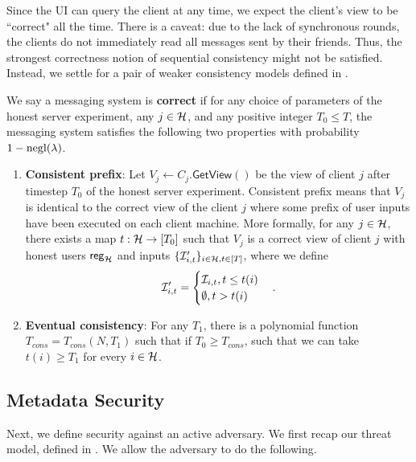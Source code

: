 Since the UI can query the client at any time, we expect the client's view to be ``correct" all the time. There is a caveat: due to the lack of synchronous rounds, the clients do not immediately read all messages sent by their friends. Thus, the strongest correctness notion of sequential consistency might not be satisfied. Instead, we settle for a pair of weaker consistency models defined in \cite{doug13Consistency}. 
\begin{definition}
\label{defn:messaging-correctness}
 We say a messaging system is \textbf{correct} if for any choice of parameters of the honest server experiment, any $j \in \mathcal{H}$, and any positive integer $T_0 \leq T$,  the messaging system satisfies the following two properties with probability $1 - \operatorname{negl}(\lambda)$.
 
 \begin{enumerate}
     \item \textbf{Consistent prefix}: Let $V_j \leftarrow C_j.\mathsf{GetView}()$ be the view of client $j$ after timestep $T_0$ of the honest server experiment. Consistent prefix means that $V_j$ is identical to the correct view of the client $j$ where some prefix of user inputs have been executed on each client machine. More formally, for any $j \in \mathcal{H}$, there exists a map $t: \mathcal{H} \to [T_0]$ such that $V_j$ is a correct view of client $j$ with honest users $\mathsf{reg}_{\mathcal{H}}$ and inputs $\{\mathcal{I}'_{i, t}\}_{i \in \mathcal{H}, t \in [T]}$, where we define
$$\mathcal{I}'_{i, t} = \begin{cases}
\mathcal{I}_{i, t}, t \leq t(i) \\
\emptyset, t > t(i)
\end{cases}.$$
\item \textbf{Eventual consistency}: For any $T_1$, there is a polynomial function $T_{cons} = T_{cons}(N, T_1)$ such that if $T_0 \geq T_{cons}$, such that we can take $t(i) \geq T_1$ for every $i \in \mathcal{H}$.
 \end{enumerate}
\end{definition}

\subsection{Metadata Security}
\label{subsec:messaging-security-integrity}
Next, we define security against an active adversary. We first recap our threat model, defined in \cite[Section 2.2]{whitepaper}. We allow the adversary to do the following.

